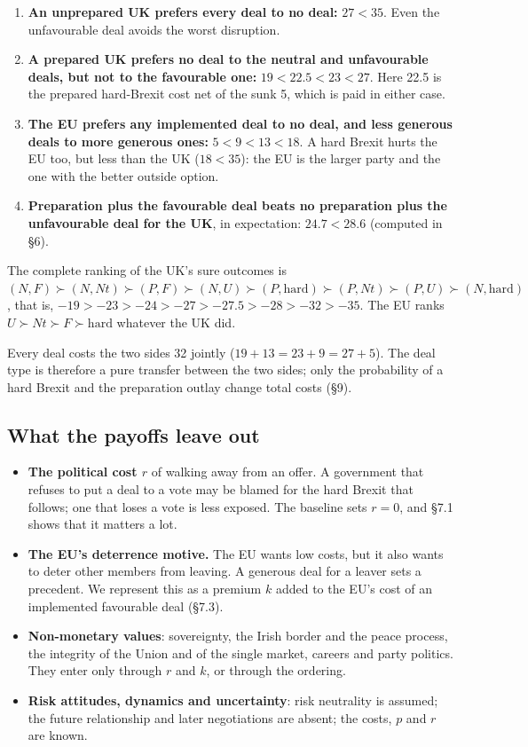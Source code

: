 \documentclass[11pt,a4paper]{article}
\newcommand{\Nt}{\mathit{Nt}}
\newcommand{\dF}{\mathit{F}}
\newcommand{\dU}{\mathit{U}}
\begin{document}
\begin{enumerate}[label=(O\arabic*)]
  \item \textbf{An unprepared UK prefers every deal to no deal:} $27<35$. Even the unfavourable
    deal avoids the worst disruption.
  \item \textbf{A prepared UK prefers no deal to the neutral and unfavourable deals, but not to the
    favourable one:} $19<22.5<23<27$. Here 22.5 is the prepared hard-Brexit cost net of the sunk
    5, which is paid in either case.
  \item \textbf{The EU prefers any implemented deal to no deal, and less generous deals to more
    generous ones:} $5<9<13<18$. A hard Brexit hurts the EU too, but less than the UK
    ($18<35$): the EU is the larger party and the one with the better outside option.
  \item \textbf{Preparation plus the favourable deal beats no preparation plus the unfavourable
    deal for the UK}, in expectation: $24.7<28.6$ (computed in \S6).
\end{enumerate}

The complete ranking of the UK's sure outcomes is
$(N,\dF)\succ(N,\Nt)\succ(P,\dF)\succ(N,\dU)\succ(P,\text{hard})\succ(P,\Nt)\succ(P,\dU)\succ(N,\text{hard})$,
that is, $-19>-23>-24>-27>-27.5>-28>-32>-35$. The EU ranks
$\dU\succ\Nt\succ\dF\succ\text{hard}$ whatever the UK did.

Every deal costs the two sides 32 jointly ($19+13=23+9=27+5$). The deal type is therefore a pure
transfer between the two sides; only the probability of a hard Brexit and the preparation outlay
change total costs (\S9).

\subsection{What the payoffs leave out}

\begin{itemize}
  \item \textbf{The political cost $r$} of walking away from an offer. A government that refuses
    to put a deal to a vote may be blamed for the hard Brexit that follows; one that loses a vote
    is less exposed. The baseline sets $r=0$, and \S7.1 shows that it matters a lot.
  \item \textbf{The EU's deterrence motive.} The EU wants low costs, but it also wants to deter
    other members from leaving. A generous deal for a leaver sets a precedent. We represent this as a
    premium $k$ added to the EU's cost of an implemented favourable deal (\S7.3).
  \item \textbf{Non-monetary values}: sovereignty, the Irish border and the peace process, the
    integrity of the Union and of the single market, careers and party politics. They enter only
    through $r$ and $k$, or through the ordering.
  \item \textbf{Risk attitudes, dynamics and uncertainty}: risk neutrality is assumed; the
    future relationship and later negotiations are absent; the costs, $p$ and $r$ are known.
\end{itemize}
\end{document}

